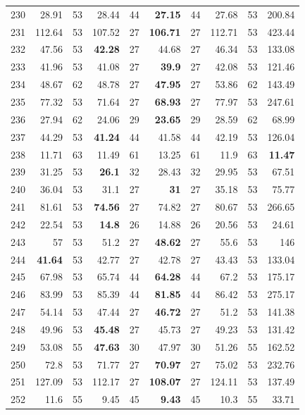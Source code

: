 \begin{longtable}{lr@{\hskip 4pt}l@{\hskip 12pt}r@{\hskip 4pt}l@{\hskip 12pt}r@{\hskip 4pt}l@{\hskip 12pt}r@{\hskip 4pt}l@{\hskip 12pt}r}
230 & 28.91 & 53 & 28.44 & 44 & \textbf{27.15} & 44 & 27.68 & 53 & 200.84 \\
231 & 112.64 & 53 & 107.52 & 27 & \textbf{106.71} & 27 & 112.71 & 53 & 423.44 \\
232 & 47.56 & 53 & \textbf{42.28} & 27 & 44.68 & 27 & 46.34 & 53 & 133.08 \\
233 & 41.96 & 53 & 41.08 & 27 & \textbf{39.9} & 27 & 42.08 & 53 & 121.46 \\
234 & 48.67 & 62 & 48.78 & 27 & \textbf{47.95} & 27 & 53.86 & 62 & 143.49 \\
235 & 77.32 & 53 & 71.64 & 27 & \textbf{68.93} & 27 & 77.97 & 53 & 247.61 \\
236 & 27.94 & 62 & 24.06 & 29 & \textbf{23.65} & 29 & 28.59 & 62 & 68.99 \\
237 & 44.29 & 53 & \textbf{41.24} & 44 & 41.58 & 44 & 42.19 & 53 & 126.04 \\
238 & 11.71 & 63 & 11.49 & 61 & 13.25 & 61 & 11.9 & 63 & \textbf{11.47} \\
239 & 31.25 & 53 & \textbf{26.1} & 32 & 28.43 & 32 & 29.95 & 53 & 67.51 \\
240 & 36.04 & 53 & 31.1 & 27 & \textbf{31} & 27 & 35.18 & 53 & 75.77 \\
241 & 81.61 & 53 & \textbf{74.56} & 27 & 74.82 & 27 & 80.67 & 53 & 266.65 \\
242 & 22.54 & 53 & \textbf{14.8} & 26 & 14.88 & 26 & 20.56 & 53 & 24.61 \\
243 & 57 & 53 & 51.2 & 27 & \textbf{48.62} & 27 & 55.6 & 53 & 146 \\
244 & \textbf{41.64} & 53 & 42.77 & 27 & 42.78 & 27 & 43.43 & 53 & 133.04 \\
245 & 67.98 & 53 & 65.74 & 44 & \textbf{64.28} & 44 & 67.2 & 53 & 175.17 \\
246 & 83.99 & 53 & 85.39 & 44 & \textbf{81.85} & 44 & 86.42 & 53 & 275.17 \\
247 & 54.14 & 53 & 47.44 & 27 & \textbf{46.72} & 27 & 51.2 & 53 & 141.38 \\
248 & 49.96 & 53 & \textbf{45.48} & 27 & 45.73 & 27 & 49.23 & 53 & 131.42 \\
249 & 53.08 & 55 & \textbf{47.63} & 30 & 47.97 & 30 & 51.26 & 55 & 162.52 \\
250 & 72.8 & 53 & 71.77 & 27 & \textbf{70.97} & 27 & 75.02 & 53 & 232.76 \\
251 & 127.09 & 53 & 112.17 & 27 & \textbf{108.07} & 27 & 124.11 & 53 & 137.49 \\
252 & 11.6 & 55 & 9.45 & 45 & \textbf{9.43} & 45 & 10.3 & 55 & 33.71 \\

\end{longtable}
